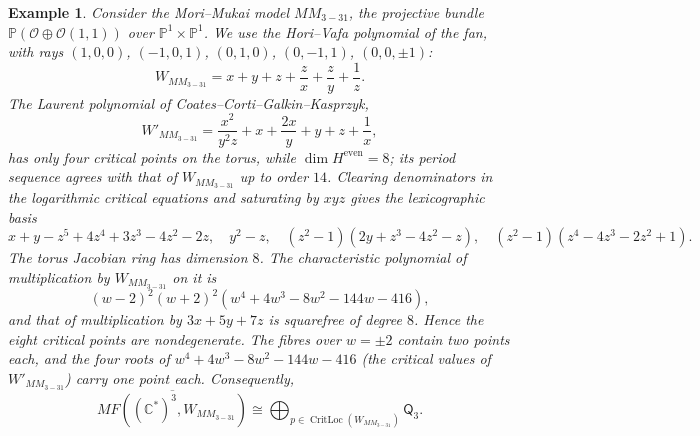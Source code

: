 \documentclass[11pt]{amsart}
\newtheorem{example}{Example}[section]
\DeclareMathOperator{\CritLoc}{CritLoc}
\newcommand{\MorseCat}[1]{\mathsf{Q}_{#1}}
\begin{document}
\begin{example}
Consider the Mori--Mukai model $MM_{3-31}$, the projective bundle
$\mathbb{P}(\mathcal O\oplus\mathcal O(1,1))$ over $\mathbb{P}^1\times\mathbb{P}^1$.
We use the Hori--Vafa polynomial of the fan, with rays $(1,0,0)$,
$(-1,0,1)$, $(0,1,0)$, $(0,-1,1)$, $(0,0,\pm1)$:
\[
W_{MM_{3-31}}=x+y+z+\frac{z}{x}+\frac{z}{y}+\frac{1}{z}.
\]
The Laurent polynomial of Coates--Corti--Galkin--Kasprzyk,
\[
W'_{MM_{3-31}}=\frac{x^2}{y^2z}+x+\frac{2x}{y}+y+z+\frac{1}{x},
\]
has only four critical points on the torus, while
$\dim H^{\mathrm{even}}=8$; its period sequence agrees with that of
$W_{MM_{3-31}}$ up to order $14$.
Clearing denominators in the logarithmic critical equations and saturating
by $xyz$ gives the lexicographic basis
\[
x+y-z^5+4z^4+3z^3-4z^2-2z,\quad
y^2-z,\quad
(z^2-1)(2y+z^3-4z^2-z),\quad
(z^2-1)(z^4-4z^3-2z^2+1).
\]
The torus Jacobian ring has dimension $8$. The characteristic polynomial of
multiplication by $W_{MM_{3-31}}$ on it is
\[
(w-2)^2(w+2)^2(w^4+4w^3-8w^2-144w-416),
\]
and that of multiplication by $3x+5y+7z$ is squarefree of degree $8$. Hence
the eight critical points are nondegenerate. The fibres over $w=\pm2$ contain
two points each, and the four roots of $w^4+4w^3-8w^2-144w-416$ (the critical
values of $W'_{MM_{3-31}}$) carry one point each. Consequently,
\[
\overline{MF((\mathbb{C}^*)^3,W_{MM_{3-31}})}
\cong \bigoplus_{p\in\CritLoc(W_{MM_{3-31}})}\MorseCat{3}.
\]
\end{example}
\end{document}
